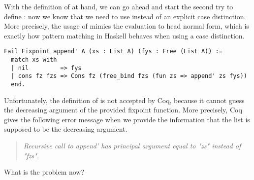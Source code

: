 With the definition of  at hand, we can go ahead and start the second try to define : now we know that we need to use  instead of an explicit case distinction.
More precisely, the usage of  mimics the evaluation to head normal form, which is exactly how pattern matching in Haskell behaves when using a case distinction.

\begin{verbatim}
Fail Fixpoint append' A (xs : List A) (fys : Free (List A)) :=
  match xs with
  | nil         => fys
  | cons fz fzs => Cons fz (free_bind fzs (fun zs => append' zs fys))
  end.
\end{verbatim}

Unfortunately, the definition of  is not accepted by Coq, because it cannot guess the decreasing argument of the provided fixpoint function.
More precisely, Coq gives the following error message when we provide the information that the list  is supposed to be the decreasing argument.

\begin{quote}
\emph{Recursive call to append' has principal argument equal to "zs" instead of "fzs".}
\end{quote}

What is the problem now?

